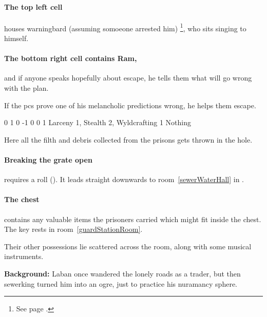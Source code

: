 
\paragraph{The top left cell}
houses \gls{warningbard} (assuming somoeone arrested him)%
\footnote{See page \pageref{warningbard}.},
who sits singing to himself.

\paragraph{The bottom right cell contains Ram,}
and if anyone speaks hopefully about escape, he tells them what will go wrong with the plan.

If the \glspl{pc} prove one of his melancholic predictions wrong, he helps them escape.

{0}%
{1}%
{{0}%
{-1}%
{0}}%
{0}%
{1}%
{Larceny 1, Stealth 2, Wyldcrafting 1}%
{Nothing}%
{}


Here all the filth and debris collected from the prisons gets thrown in the hole.

\paragraph{Breaking the grate open}
requires a  roll (\tn[10]).
It leads straight downwards to room~\vref{sewerWaterHall} in .


\paragraph{The chest}
contains any valuable items the prisoners carried which might fit inside the chest.
The key rests in room~\ref{guardStationRoom}.

Their other possessions lie scattered across the room, along with some musical instruments.


\textbf{Background:}
Laban once wandered the lonely roads as a trader, but then \Gls{sewerking} turned him into an ogre, just to practice his nuramancy sphere.

